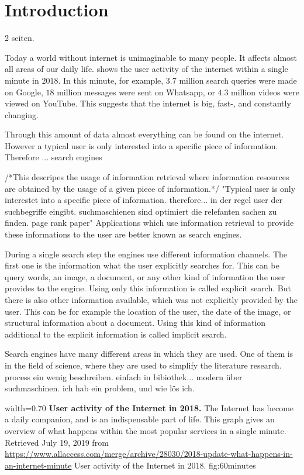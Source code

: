 \chapter{Introduction}
\label{cha:introduction}
2 seiten.

Today a world without internet is unimaginable to many people. It affects almost all areas of our daily life.  shows the user activity of the internet within a single minute in $2018$. In this minute, for example, $3.7$ million search queries were made on Google, $18$ million messages were sent on Whatsapp, or $4.3$ million videos were viewed on YouTube. This suggests that the internet is big, fast-, and constantly changing.

Through this amount of data almost everything can be found on the internet. However a typical user is only interested into a specific piece of information. Therefore ... search engines



/*This descripes the usage of information retrieval where information resources are obtained by the usage of a given piece of information.*/ "Typical user is only interestet into a specific piece of information. therefore... in der regel user der suchbegriffe eingibt. suchmaschienen sind optimiert die relefanten sachen zu finden. page rank paper" Applications which use information retrieval to provide these informations to the user are better known as search engines.

During a single search step the engines use different information channels. The first one is the information what the user explicitly searches for. This can be query words, an image, a document, or any other kind of information the user provides to the engine. Using only this information is called explicit search. But there is also other information available, which was not explicitly provided by the user. This can be for example the location of the user, the date of the image, or structural information about a document. Using this kind of information additional to the explicit information is called implicit search. %

Search engines have many different areas in which they are used. One of them is in the field of science, where they are used to simplify the literature research. process ein wenig beschreiben. einfach in bibiothek... modern über suchmaschinen. ich hab ein problem, und wie lös ich.


      {width=0.70\textwidth}
      {\textbf{User activity of the Internet in 2018.} The Internet has become a daily companion, and is an indispensable part of life. This graph gives an overview of what happens within the most popular services in a single minute. Retrieved July 19, 2019 from \url{https://www.allaccess.com/merge/archive/28030/2018-update-what-happens-in-an-internet-minute}}
      {User activity of the Internet in 2018.}
      {fig:60minutes}

